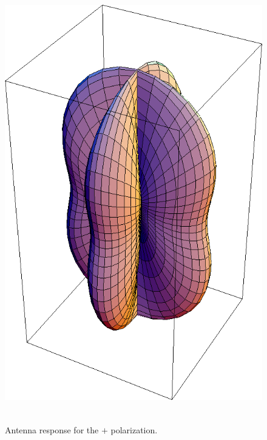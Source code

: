 \begin{figure}[!h]
\centerline{\includegraphics[angle=0,height=7.5in]{Figures/AppI/Peanut-plus.png}}
\caption[Peanut (plus)]{Antenna response for the $+$ polarization.}
\label{eq:Peanut-plus}
\end{figure}

